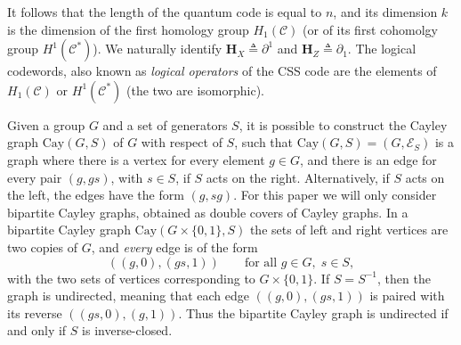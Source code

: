 \documentclass[a4paper,twocolumn,11pt,accepted=2026-05-03]{quantumarticle}
\begin{document}
It follows that the length of the quantum code is equal to $n$, and its dimension $k$ is the dimension of the first homology group $H_1(\mathcal{C})$ (or of its first cohomolgy group $H^1(\mathcal{C^*})$).
We naturally identify $\mathbf{H}_X \triangleq \partial^1$ and  $\mathbf{H}_Z \triangleq \partial_1$. The logical codewords, also known as \textit{logical operators} of the CSS code are the elements of $H_1(\mathcal{C})$ or $H^1(\mathcal{C^*})$ (the two are isomorphic).


Given a group $G$ and a set of generators $S$, it is possible to construct the Cayley graph $\mathrm{Cay}(G,S)$ of $G$ with respect of $S$, such that $\mathrm{Cay}(G,S) = (G,\mathcal E_S)$ is a graph where there is a vertex for every element $g \in G$, and there is an edge for every pair $(g,gs)$, with $s\in S$, if $S$ acts on the right. Alternatively, if $S$ acts on the left, the edges have the form $(g,sg)$.
For this paper we will only consider bipartite Cayley graphs, obtained as double covers of Cayley graphs. In a bipartite Cayley graph $\mathrm{Cay}(G\times \{0,1\},S)$ the sets of left and right vertices are two copies of $G$, and \emph{every} edge is of the form
$$
((g,0),(gs,1)) \qquad \text{for all } g\in G,\; s\in S,
$$
with the two sets of vertices corresponding to $G\times\{0,1\}$.
If $S=S^{-1}$, then the graph is undirected, meaning that each edge $((g,0),(gs,1))$ is paired with its reverse $((gs,0),(g,1))$. 
Thus the bipartite Cayley graph is undirected if and only if $S$ is inverse-closed.
\end{document}
